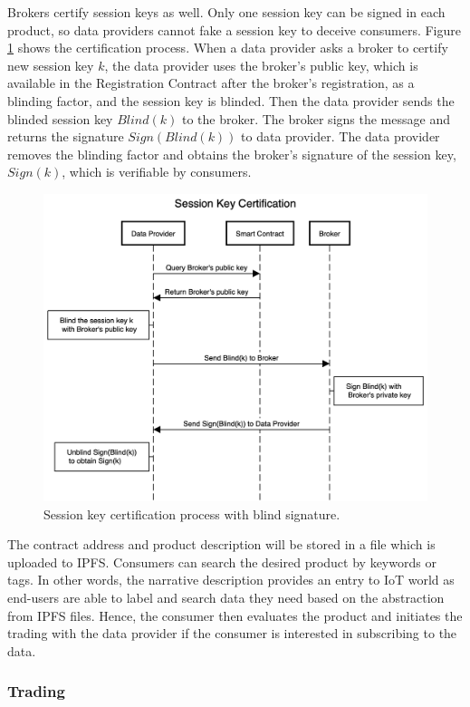 \documentclass[journal,article,applsci,submit,moreauthors,pdftex]{Definitions/mdpi}
\begin{document}
Brokers certify session keys as well. Only one session key can be signed in each product, so data providers cannot fake a session key to deceive consumers. Figure \ref{fig:key_certification} shows the certification process. When a data provider asks a broker to certify new session key $k$, the data provider uses the broker's public key, which is available in the Registration Contract after the broker's registration, as a blinding factor, and the session key is blinded. Then the data provider sends the blinded session key $Blind(k)$ to the broker. The broker signs the message and returns the signature $Sign(Blind(k))$ to data provider. The data provider removes the blinding factor and obtains the broker's signature of the session key, $Sign(k)$, which is verifiable by consumers.

\begin{figure}[H]
    \centering
    \includegraphics[width=4.4 in]{key_certification}
    \caption{Session key certification process with blind signature.}
    \label{fig:key_certification}
\end{figure}

The contract address and product description will be stored in a file which is uploaded to IPFS. Consumers can search the desired product by keywords or tags. In other words, the narrative description provides an entry to IoT world as end-users are able to label and search data they need based on the abstraction from IPFS files. Hence, the consumer then evaluates the product and initiates the trading with the data provider if the consumer is interested in subscribing to the data.

\subsubsection{Trading}
\label{section:trading}
\end{document}
